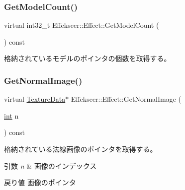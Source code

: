 \subsubsection{\texorpdfstring{Get\+Model\+Count()}{GetModelCount()}}
{\footnotesize\ttfamily virtual int32\+\_\+t Effekseer\+::\+Effect\+::\+Get\+Model\+Count (\begin{DoxyParamCaption}{ }\end{DoxyParamCaption}) const\hspace{0.3cm}{\ttfamily [pure virtual]}}



格納されているモデルのポインタの個数を取得する。 

\mbox{\label{class_effekseer_1_1_effect_a01db218b1cdb55feb5425aa602c2e010}} 
\subsubsection{\texorpdfstring{Get\+Normal\+Image()}{GetNormalImage()}}
{\footnotesize\ttfamily virtual \mbox{\hyperlink{struct_effekseer_1_1_texture_data}{Texture\+Data}}$\ast$ Effekseer\+::\+Effect\+::\+Get\+Normal\+Image (\begin{DoxyParamCaption}\item[{\mbox{\hyperlink{namespace_effekseer_ace0abf7c2e6947e519ebe8b54cbcc30a}{int}}}]{n }\end{DoxyParamCaption}) const\hspace{0.3cm}{\ttfamily [pure virtual]}}



格納されている法線画像のポインタを取得する。 


\begin{DoxyParams}{引数}
{\em n} & 画像のインデックス \\
\hline
\end{DoxyParams}
\begin{DoxyReturn}{戻り値}
画像のポインタ 
\end{DoxyReturn}
\mbox{\label{class_effekseer_1_1_effect_ac83290b7ca5f898b6508fe01821a0ddc}} 

